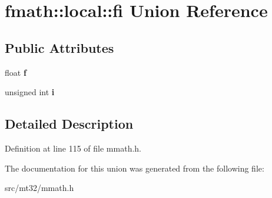 \hypertarget{unionfmath_1_1local_1_1fi}{\section{fmath\-:\-:local\-:\-:fi Union Reference}
\label{unionfmath_1_1local_1_1fi}
}
\subsection*{Public Attributes}
\begin{DoxyCompactItemize}
\item 
\hypertarget{unionfmath_1_1local_1_1fi_a55615454f6872f8fbf6d3ab31f00e8f1}{float {\bfseries f}}\label{unionfmath_1_1local_1_1fi_a55615454f6872f8fbf6d3ab31f00e8f1}

\item 
\hypertarget{unionfmath_1_1local_1_1fi_a8b7e206a255d19ace89a2c4b993bd03e}{unsigned int {\bfseries i}}\label{unionfmath_1_1local_1_1fi_a8b7e206a255d19ace89a2c4b993bd03e}

\end{DoxyCompactItemize}


\subsection{Detailed Description}


Definition at line 115 of file mmath.\-h.



The documentation for this union was generated from the following file\-:\begin{DoxyCompactItemize}
\item 
src/mt32/mmath.\-h\end{DoxyCompactItemize}
